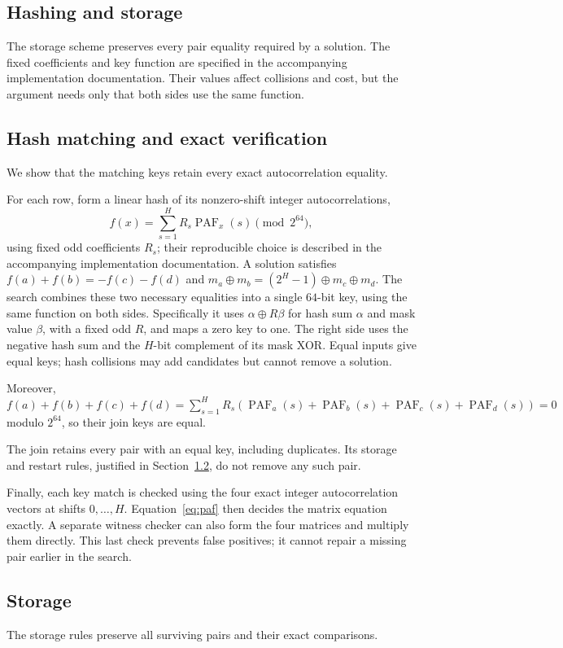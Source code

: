 \documentclass[11pt]{article}
\newcommand{\PAF}{\operatorname{PAF}}
\begin{document}
\begin{appendices}
\section{Hashing and storage}\label{app:join}
The storage scheme preserves every pair equality required by a solution.
The fixed coefficients and key function are specified in the accompanying
implementation documentation. Their values affect collisions and cost, but
the argument needs only that both sides use the same function.

\subsection{Hash matching and exact verification}\label{app:matching}
We show that the matching keys retain every exact autocorrelation equality.

For each row, form a linear hash of its nonzero-shift integer
autocorrelations,
\[
 f(x)=\sum_{s=1}^{H}R_s\PAF_x(s)\pmod {2^{64}},
\]
using fixed odd coefficients $R_s$; their reproducible choice is described
in the accompanying implementation documentation. A solution satisfies
$f(a)+f(b)=-f(c)-f(d)$ and
$m_a\oplus m_b=(2^H-1)\oplus m_c\oplus m_d$.
The search combines these two necessary equalities into a single
$64$-bit key, using the same function on both sides. Specifically it uses
$\alpha\oplus R\beta$ for hash sum $\alpha$ and mask value $\beta$, with a fixed odd $R$,
and maps a zero key to one. The right side uses the negative hash sum and
the $H$-bit complement of its mask XOR. Equal inputs give equal keys;
hash collisions may add candidates but cannot remove a solution.

Moreover,
$ f(a)+f(b)+f(c)+f(d)
=\sum_{s=1}^{H}R_s(\PAF_a(s)+\PAF_b(s)+\PAF_c(s)+\PAF_d(s))=0$
modulo $2^{64}$, so their join keys are equal.

The join retains every pair with an equal key, including duplicates.
Its storage and restart rules, justified in Section~\ref{app:storage}, do
not remove any such pair.

Finally, each key match is checked using the four exact integer
autocorrelation vectors at shifts $0,\ldots,H$. Equation~\eqref{eq:paf}
then decides the matrix equation exactly. A separate witness checker can
also form the four matrices and multiply them directly. This last check
prevents false positives; it cannot repair a missing pair earlier in the
search.

\subsection{Storage}\label{app:storage}
The storage rules preserve all surviving pairs and their exact comparisons.


\end{appendices}
\end{document}

